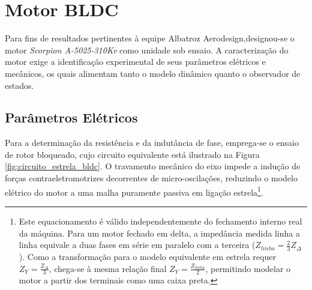 \section{Motor BLDC}
\label{sec:motor_bldc}

Para fins de resultados pertinentes à equipe Albatroz Aerodesign,designou-se o motor \textit{Scorpion A-5025-310Kv} como unidade sob ensaio. A caracterização do motor exige a identificação experimental de seus parâmetros elétricos e mecânicos, os quais alimentam tanto o modelo dinâmico quanto o observador de estados.

\subsection{Parâmetros Elétricos}
\label{sec:params_eletricos}

Para a determinação da resistência e da indutância de fase, emprega-se o ensaio de rotor bloqueado, cujo circuito equivalente está ilustrado na Figura \ref{fig:circuito_estrela_bldc}. O travamento mecânico do eixo impede a indução de forças contraeletromotrizes decorrentes de micro-oscilações, reduzindo o modelo elétrico do motor a uma malha puramente passiva em ligação estrela\footnote{Este equacionamento é válido independentemente do fechamento interno real da máquina. Para um motor fechado em delta, a impedância medida linha a linha equivale a duas fases em série em paralelo com a terceira ($Z_{linha} = \frac{2}{3}Z_{\Delta}$). Como a transformação para o modelo equivalente em estrela requer $Z_Y = \frac{Z_{\Delta}}{3}$, chega-se à mesma relação final $Z_Y = \frac{Z_{linha}}{2}$, permitindo modelar o motor a partir dos terminais como uma caixa preta.}.

